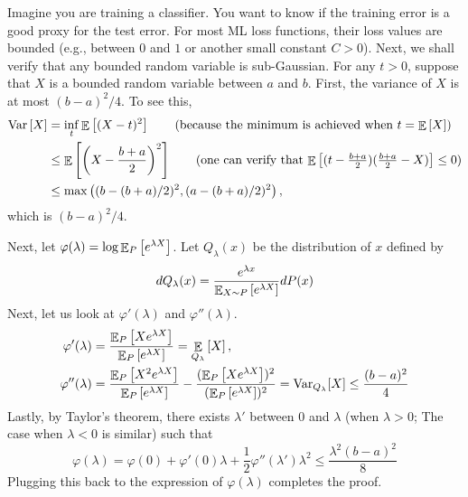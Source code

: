 \begin{example}\label{ex_bounded_subg}
    Imagine you are training a classifier. You want to know if the training error is a good proxy for the test error.
    For most ML loss functions, their loss values are bounded (e.g., between $0$ and $1$ or another small constant $C > 0$).
    Next, we shall verify that any bounded random variable is sub-Gaussian.
    For any $t > 0$, suppose that $X$ is a bounded random variable between $a$ and $b$. %
    First, the variance of $X$ is at most $(b - a)^2 / 4$.
    To see this, 
    \begin{align*}
        \Var{X} &= \inf_t \ex{(X - t)^2} \tag{because the minimum is achieved when $t = \ex{X}$}\\
        &\le \ex{\left(X - \frac{b + a} 2\right)^2} \tag{one can verify that $\ex{(t - \frac{b+a}2) (\frac{b+a}2 - X)} \le 0$} \\
        &\le \max\left((b - (b+a)/2)^2, (a - (b+a)/2)^2\right), 
    \end{align*}
    which is $(b - a)^2/ 4$.
    
    Next, let $\varphi(\lambda) = \log \mathop{\mathbb{E}}_{P}\left[ e^{\lambda X} \right]$.
    Let $Q_\lambda(x)$ be the distribution of $x$ defined by
    \[ dQ_\lambda(x) = \frac{e^{\lambda x}}{\mathop{\mathbb{E}}_{X\sim P}\left[ e^{\lambda X} \right]} dP(x) \]
    Next, let us look at $\varphi'(\lambda)$ and $\varphi''(\lambda)$.
    \begin{align*} 
        \varphi'(\lambda) &= \frac{\mathop{\mathbb{E}}_{P}\left[ X e^{\lambda X} \right]}{\mathop{\mathbb{E}}_{P}\left[ e^{\lambda X} \right]} = \mathop{\mathbb{E}}_{Q_{\lambda}}\left[ X \right], \\
        \varphi''(\lambda) &= \frac{\mathop{\mathbb{E}}_{P}\left[ X^2 e^{\lambda X} \right]}{\mathop{\mathbb{E}}_{P}\left[ e^{\lambda X} \right]} - \frac{ (\mathop{\mathbb{E}}_{P}\left[ X e^{\lambda X} \right])^2 }{ (\mathop{\mathbb{E}}_{P}\left[ e^{\lambda X} \right])^2 } = \textup{Var}_{Q_\lambda}{[X]} \le \frac{(b-a)^2} 4
    \end{align*}
    Lastly, by Taylor's theorem, there exists $\lambda'$ between $0$ and $\lambda$ (when $\lambda > 0$; The case when $\lambda < 0$ is similar) such that
    \[ \varphi(\lambda) = \varphi(0) + \varphi'(0) \lambda + \frac 1 2 \varphi''(\lambda') \lambda^2 \le \frac{\lambda^2 (b-a)^2} 8 \]
    Plugging this back to the expression of $\varphi(\lambda)$ completes the proof.
\end{example}

